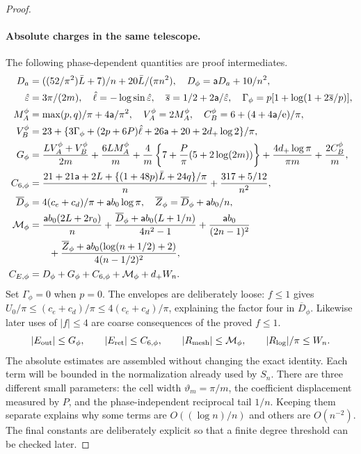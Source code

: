 \begin{proof}
\paragraph{Absolute charges in the same telescope.}
The following phase-dependent quantities are proof intermediates.
\begin{align}\label{uc:phase-allowance}
 D_a&=((52/\pi^2)\bar{L}+7)/n+20\bar{L}/(\pi n^2),\quad
 D_\phi=\mathsf{a}D_a+10/n^2,\notag\\
 \hat{\varepsilon}&=3\pi/(2m),\quad \hat{\ell}=-\log\sin\hat{\varepsilon},\quad
 \overline s=1/2+2\mathsf{a}/\hat{\varepsilon},\quad
 \Gamma_\phi=p[1+\log(1+2\overline s/p)],\notag\\
 M_A^\phi&=\max(p,q)/\pi+4\mathsf{a}/\pi^2,\quad V_A^\phi=2M_A^\phi,
 \quad C_B^\phi=6+(4+4\mathsf{a}/\mathrm e)/\pi,\notag\\
 V_B^\phi&=23+\{3\Gamma_\phi+(2p+6P)\hat{\ell}+26\mathsf{a}+20+2d_+\log2\}/\pi,
 \notag\\
 G_\phi&=\frac{LV_A^\phi+V_B^\phi}{2m}+\frac{6LM_A^\phi}{m}
 +\frac4m\left\{7+\frac P\pi(5+2\log(2m))\right\}
 +\frac{4d_+\log\pi}{\pi m}+\frac{2C_B^\phi}{m},\notag\\
 C_{6,\phi}&=\frac{21+21\mathsf{a}+2L+\{(1+48p)\bar{L}+24q\}/\pi}{n}
                         +\frac{317+5/12}{n^2},\notag\\
 \overline D_\phi&=4(c_e+c_d)/\pi+\mathsf{a}b_0\log\pi,\quad
 \overline Z_\phi=\overline D_\phi+\mathsf{a}b_0/n,\notag\\
 \mathcal M_\phi&=\frac{\mathsf{a}b_0(2L+2r_0)}n
 +\frac{\overline D_\phi+\mathsf{a}b_0(L+1/n)}{4n^2-1}
 +\frac{\mathsf{a}b_0}{(2n-1)^2}\notag\\
 &\qquad+\frac{\overline Z_\phi+\mathsf{a}b_0(\log(n+1/2)+2)}{4(n-1/2)^2},\notag\\
 C_{E,\phi}&=D_\phi+G_\phi+C_{6,\phi}+\mathcal M_\phi+d_+W_n.
\end{align}
Set $\Gamma_\phi=0$ when $p=0$.
The envelopes are deliberately loose: $f\leq1$ gives
$U_0/\pi\leq(c_e+c_d)/\pi\leq4(c_e+c_d)/\pi$, explaining the
factor four in $\overline D_\phi$. Likewise later uses of $|f|\leq4$
are coarse consequences of the proved $f\leq1$.
\begin{equation}\label{uc:absolute-components}
 |E_{\rm out}|\leq G_\phi,\qquad |E_{\rm ret}|\leq C_{6,\phi},
 \qquad |R_{\rm mesh}|\leq\mathcal M_\phi,
 \qquad |R_{\log}|/\pi\leq W_n.
\end{equation}
The absolute estimates are assembled without changing the exact
identity. Each term will be bounded in the normalization already used
by $S_n$. There are three different small parameters: the cell width
$\vartheta_m=\pi/m$, the coefficient displacement measured by $P$, and the
phase-independent reciprocal tail $1/n$. Keeping them separate
explains why some terms are $O((\log n)/n)$ and others are
$O(n^{-2})$. The final constants are deliberately explicit so that a
finite degree threshold can be checked later.


\end{proof}
